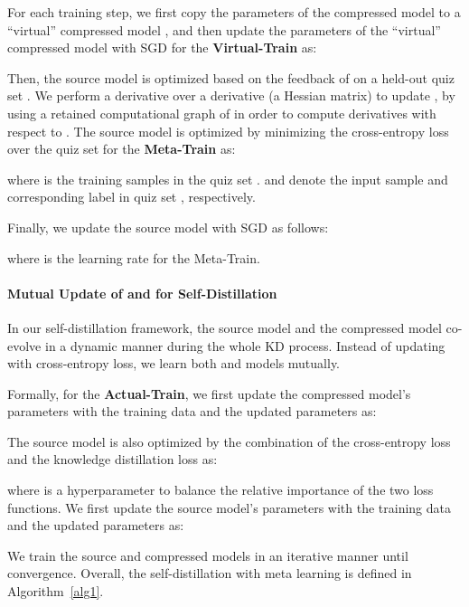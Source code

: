 \documentclass[11pt]{article}
\begin{document}
For each training step,
we first copy the parameters  of the compressed model  to a ``virtual'' compressed model , and then update the parameters  of the ``virtual'' compressed model  with SGD \cite{bottou2012stochastic} for the \textbf{Virtual-Train} as:


Then, the source model  is optimized based on the feedback of  on a held-out quiz set . We perform a derivative over a derivative (a Hessian matrix) to update , by using a retained computational graph of  
in order to compute derivatives with respect
to . The source model  is optimized by minimizing the cross-entropy loss over the quiz set   for the \textbf{Meta-Train} as:

where  is the training samples in the quiz set .  and  denote the input sample and corresponding label in quiz set , respectively. 

Finally, we update the source model  with SGD \cite{bottou2012stochastic} as follows:

where  is the learning rate for the Meta-Train. 

\paragraph{Mutual Update of  and  for Self-Distillation} 
In our self-distillation framework, the source model  and the compressed model  co-evolve in a dynamic manner during the whole KD process. Instead of updating  with cross-entropy loss, we learn both  and  models mutually. 

Formally, for the \textbf{Actual-Train}, we first update the compressed model's parameters  with the training data and the updated parameters  as:


The source model  is also optimized by the combination of the cross-entropy loss  and the knowledge distillation loss  as:

\vspace{-0.4cm}

\vspace{-0.4cm}

where  is a hyperparameter to balance the relative importance of the two loss functions. We first update the source model's parameters  with the training data and the updated parameters  as:


We train the source and compressed models in an iterative manner until convergence. 
Overall, the self-distillation with meta learning is defined in Algorithm~\ref{alg1}.
\end{document}
